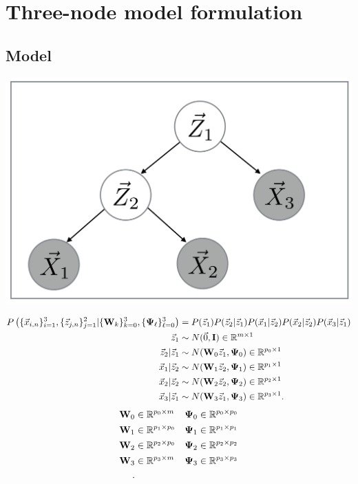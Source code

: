 \chapter{Three-node model formulation}
\section{Model}
\begin{center}
\includegraphics[width=\textwidth/3]{MFAA.png}
\end{center}
\newcommand{\fulljointp}{P \left(
  \{\x_{i,n}\}_{i=1}^3,\{ \z_{j,n}\}_{j=1}^2| \{\W_k\}_{k=0}^3,
    \{\bpsi_{\ell}\}_{\ell=0}^3 \right)}
\begin{align*}
  \fulljointp &= P(\z_1) P(\z_2 | \z_1) P(\x_1 | \z_2) P(\x_2 | \z_2)
                P(\x_3 | \z_1) \\
  \z_1 &\sim N(\vec{0}, \I ) \inreala{m}{1} \\
  \z_2| \z_1 &\sim N(\W_0 \z_1, \bpsi_0) \inreala{p_0}{1}\\
  \x_1 | \z_2 &\sim N(\W_1 \z_2, \bpsi_1) \inreala{ p_1}{1}\\
  \x_2 | \z_2 &\sim N(\W_2 \z_2, \bpsi_2) \inreala{p_2}{1} \\
  \x_3 | \z_1 &\sim N(\W_3 \z_1, \bpsi_3) \inreala{p_3}{1}
.\end{align*}
\begin{align*}
  \bold{W}_0 &\in \mathbb{R}^{p_0 \times m} &   \bold{\Psi}_0 &\in \mathbb{R}^{p_0 \times p_0} \\
  \bold{W}_1 &\in \mathbb{R}^{p_1 \times p_0} &  \bold{\Psi}_1 &\in \mathbb{R}^{p_1 \times p_1}\\
  \bold{W}_2 &\in \mathbb{R}^{p_2 \times p_0} &   \bold{\Psi}_2 &\in \mathbb{R}^{p_2 \times p_2}\\
  \bold{W}_3 &\in \mathbb{R}^{p_3 \times m} &         \bold{\Psi}_3 &\in \mathbb{R}^{p_3 \times p_3}\\  
.\end{align*}

